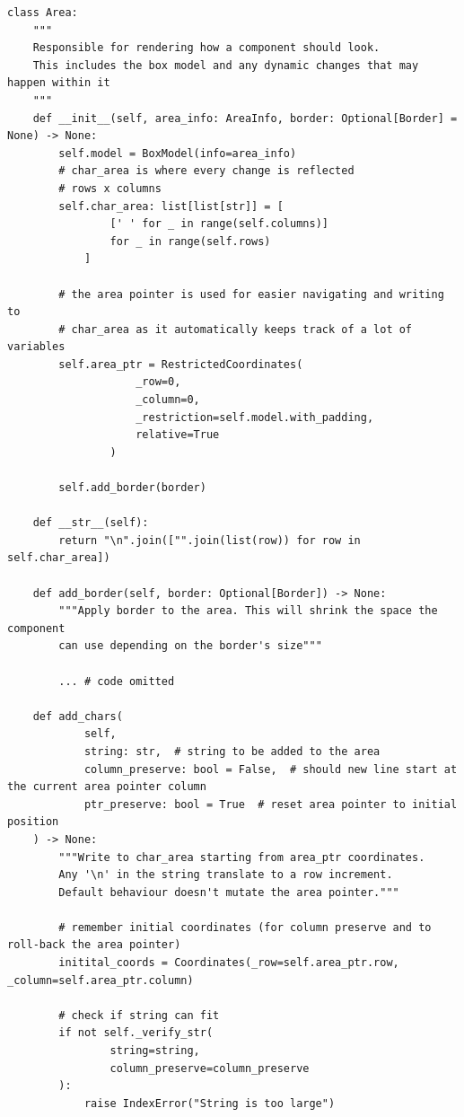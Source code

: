        \hspace{5mm}
        \begin{lstlisting}[style=py]
class Area:
    """
    Responsible for rendering how a component should look.
    This includes the box model and any dynamic changes that may happen within it
    """
    def __init__(self, area_info: AreaInfo, border: Optional[Border] = None) -> None:
        self.model = BoxModel(info=area_info)
        # char_area is where every change is reflected
        # rows x columns
        self.char_area: list[list[str]] = [
                [' ' for _ in range(self.columns)]
                for _ in range(self.rows)
            ]

        # the area pointer is used for easier navigating and writing to
        # char_area as it automatically keeps track of a lot of variables
        self.area_ptr = RestrictedCoordinates(
                    _row=0,
                    _column=0,
                    _restriction=self.model.with_padding,
                    relative=True
                )

        self.add_border(border)

    def __str__(self):
        return "\n".join(["".join(list(row)) for row in self.char_area])

    def add_border(self, border: Optional[Border]) -> None:
        """Apply border to the area. This will shrink the space the component
        can use depending on the border's size"""

        ... # code omitted

    def add_chars(
            self,
            string: str,  # string to be added to the area
            column_preserve: bool = False,  # should new line start at the current area pointer column
            ptr_preserve: bool = True  # reset area pointer to initial position
    ) -> None:
        """Write to char_area starting from area_ptr coordinates.
        Any '\n' in the string translate to a row increment.
        Default behaviour doesn't mutate the area pointer."""

        # remember initial coordinates (for column preserve and to roll-back the area pointer)
        initital_coords = Coordinates(_row=self.area_ptr.row, _column=self.area_ptr.column)

        # check if string can fit
        if not self._verify_str(
                string=string,
                column_preserve=column_preserve
        ):
            raise IndexError("String is too large")


\end{lstlisting}
